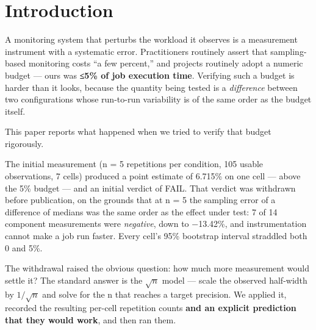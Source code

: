 \documentclass[sigconf,review,anonymous]{acmart}
\begin{document}

\maketitle

\section{Introduction}

A monitoring system that perturbs the workload it observes is a measurement instrument with a
systematic error. Practitioners routinely assert that sampling-based monitoring costs ``a few
percent,'' and projects routinely adopt a numeric budget --- ours was \textbf{≤5\% of job execution
time}. Verifying such a budget is harder than it looks, because the quantity being tested is a
\emph{difference} between two configurations whose run-to-run variability is of the same order as the
budget itself.

This paper reports what happened when we tried to verify that budget rigorously.

The initial measurement (n = 5 repetitions per condition, 105 usable observations, 7 cells)
produced a point estimate of 6.715\% on one cell --- above the 5\% budget --- and an initial verdict
of FAIL. That verdict was withdrawn before publication, on the grounds that at n = 5 the
sampling error of a difference of medians was the same order as the effect under test: 7 of 14
component measurements were \emph{negative}, down to −13.42\%, and instrumentation cannot make a job
run faster. Every cell's 95\% bootstrap interval straddled both 0 and 5\%.

The withdrawal raised the obvious question: how much more measurement would settle it? The
standard answer is the $\sqrt{n}$ model --- scale the observed half-width by $1/\sqrt{n}$ and solve for the n that
reaches a target precision. We applied it, recorded the resulting per-cell repetition counts
\textbf{and an explicit prediction that they would work}, and then ran them.
\end{document}
